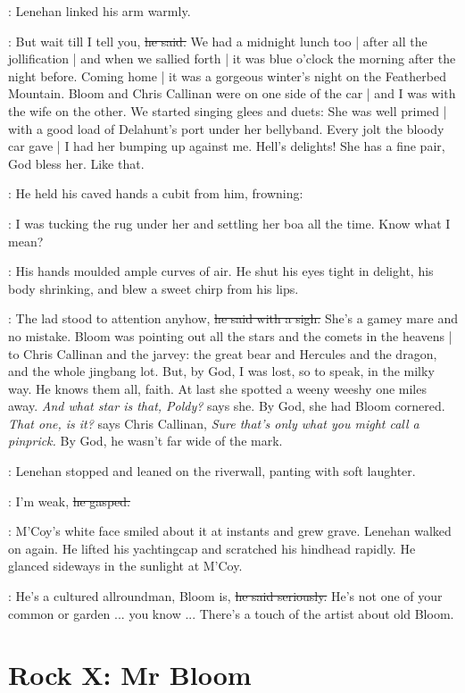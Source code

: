 :
Lenehan linked his arm warmly.

\lenehan:
But wait till I tell you,
\sout{he said.}
We had a midnight lunch too |
after all the jollification |
and when we sallied forth |
it was blue o'clock the morning after the night before.
Coming home |
it was a gorgeous winter's night on the Featherbed Mountain.
Bloom and Chris Callinan were on one side of the car |
and I was with the wife on the other.
We started singing glees and duets:
She was well primed |
with a good load of Delahunt's port under her bellyband.
Every jolt the bloody car gave |
I had her bumping up against me.
Hell's delights!
She has a fine pair, God bless her.
Like that.

:
He held his caved hands a cubit from him,
frowning:

\lenehan:
I was tucking the rug under her
and settling her boa all the time.
Know what I mean?

:
His hands moulded ample curves of air.
He shut his eyes tight in delight,
his body shrinking,
and blew a sweet chirp from his lips.

\lenehan:
The lad stood to attention anyhow,
\sout{he said with a sigh.}
She's a gamey mare and no mistake.
Bloom was pointing out all the stars and the comets in the heavens |
to Chris Callinan and the jarvey:
the great bear and Hercules and the dragon,
and the whole jingbang lot.
But, by God, I was lost,
so to speak,
in the milky way.
He knows them all, faith.
At last she spotted a weeny weeshy one miles away.
\emph{And what star is that, Poldy?}
says she.
By God, she had Bloom cornered.
\emph{That one, is it?}
says Chris Callinan,
\emph{Sure that's only what you might call a pinprick.}
By God, he wasn't far wide of the mark.

:
Lenehan stopped and leaned on the riverwall,
panting with soft laughter.

\lenehan:
I'm weak,
\sout{he gasped.}

:
M'Coy's white face smiled about it at instants and grew grave.
Lenehan walked on again.
He lifted his yachtingcap and scratched his hindhead rapidly.
He glanced sideways in the sunlight at M'Coy.

\lenehan:
He's a cultured allroundman,
Bloom is,
\sout{he said seriously.}
He's not one of your common or garden ...
you know ...
There's a touch of the artist about old Bloom.


\section*{Rock X: Mr Bloom}


